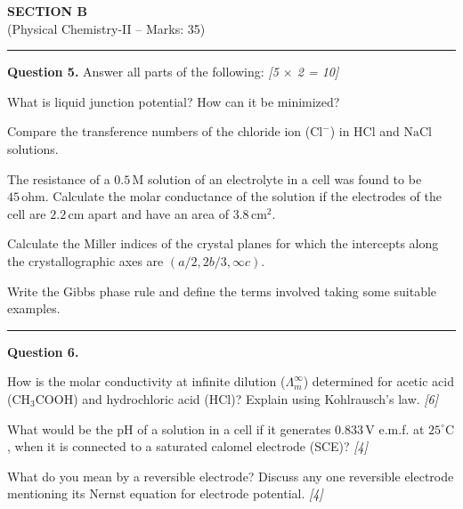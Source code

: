 \documentclass[11pt,a4paper]{article}
\newcommand{\pts}[1]{\hfill   \textit{[#1]}}
\begin{document}
\newpage

\begin{center}
  {\large\bfseries SECTION B}\\[2pt]
  {\normalsize (Physical Chemistry-II -- Marks: 35)}
\end{center}
\rule{0.4\linewidth}{0.2pt}
\smallskip




\noindent   \textbf{Question 5.} Answer all parts of the following: \pts{5 $ \times$ 2 = 10}

\begin{parts}
  \item What is liquid junction potential? How can it be minimized?
  \item Compare the transference numbers of the chloride ion ($ \text{Cl}^-$) in $ \text{HCl}$ and $ \text{NaCl}$ solutions.
  \item The resistance of a $0.5\, \text{M}$ solution of an electrolyte in a cell was found to be $45\, \text{ohm}$. Calculate the molar conductance of the solution if the electrodes of the cell are $2.2\, \text{cm}$ apart and have an area of $3.8\, \text{cm}^2$.
  \item Calculate the Miller indices of the crystal planes for which the intercepts along the crystallographic axes are $(a/2, 2b/3, \infty c)$.
  \item Write the Gibbs phase rule and define the terms involved taking some suitable examples.
\end{parts}

\medskip\rule{\linewidth}{0.2pt}




\noindent   \textbf{Question 6.}

\begin{parts}
  \item How is the molar conductivity at infinite dilution ($\Lambda_m^\infty$) determined for acetic acid ($ \text{CH}_3 \text{COOH}$) and hydrochloric acid ($ \text{HCl}$)? Explain using Kohlrausch's law. \pts{6}
  \item What would be the pH of a solution in a cell if it generates $0.833\, \text{V}$ e.m.f. at $25^\circ \text{C}$, when it is connected to a saturated calomel electrode (SCE)? \pts{4}
  \item What do you mean by a reversible electrode? Discuss any one reversible electrode mentioning its Nernst equation for electrode potential. \pts{4}
\end{parts}
\end{document}
